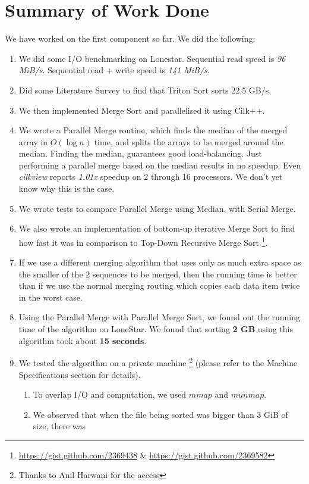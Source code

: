 \documentclass{article}
\begin{document}
\section{Summary of Work Done}
We have worked on the first component so far. We did the following:
\begin{enumerate}
\item We did some I/O benchmarking on Lonestar. Sequential read speed is \textit{96 MiB/s}. Sequential read + write speed is \textit{141 MiB/s}.
\item Did some Literature Survey to find that Triton Sort sorts 22.5 GB/s.
\item We then implemented Merge Sort and parallelised it using Cilk++.
\item We wrote a Parallel Merge routine, which finds the median of the merged array in $O(\log{n})$ time, and splits the arrays to be merged around the median. Finding the median, guarantees good load-balancing. Just performing a parallel merge based on the median results in no speedup. Even \textit{cilkview} reports \textit{1.01x} speedup on 2 through 16 processors. We don't yet know why this is the case.
\item We wrote tests to compare Parallel Merge using Median, with Serial Merge.
\item We also wrote an implementation of bottom-up iterative Merge Sort to find how fast it was in comparison to Top-Down Recursive Merge Sort \footnote{\url{https://gist.github.com/2369438} \& \url{https://gist.github.com/2369582}}.
\item If we use a different merging algorithm that uses only as much extra space as the smaller of the 2 sequences to be merged, then the running time is better than if we use the normal merging routing which copies each data item twice in the worst case.
\item Using the Parallel Merge with Parallel Merge Sort, we found out the running time of the algorithm on LoneStar. We found that sorting {\bf 2 GB} using this algorithm took about {\bf 15 seconds}.
\item We tested the algorithm on a private machine 
\footnote{Thanks to Anil Harwani for the access} (please refer 
to the Machine Specifications section for details).
	\begin{enumerate}
	\item To overlap I/O and computation, we used $mmap$ and $munmap$. 
	\item We observed that when the file being sorted was bigger than 3 GiB of size, there was

\end{enumerate}
\end{enumerate}
\end{document}
